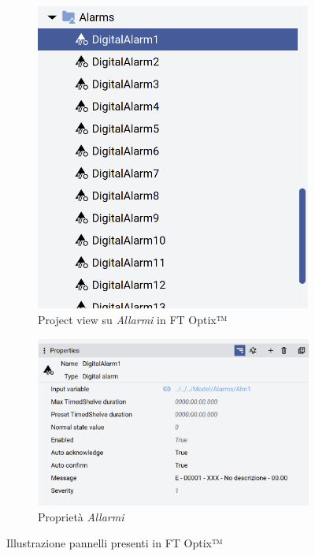 \begin{figure}[!ht]
    \centering
    \begin{subfigure}[t]{0.35\textwidth} %
        \includegraphics[width=\linewidth]{Immagini/CartellaAllarmi.png}
        \caption{Project view su \textit{Allarmi} in FT Optix™}
        \label{fig:CartellaAllarmi.png}
    \end{subfigure}
    \hfill
    \begin{subfigure}[t]{0.55\textwidth} %
        \centering
        \includegraphics[width=\linewidth]{Immagini/AllarmiInfografica.png}
        \caption{Proprietà \textit{Allarmi}}
        \label{fig:AllarmiInfografica.png}
    \end{subfigure}
    \caption{Illustrazione pannelli presenti in FT Optix™}
    \label{fig:two-images00}
\end{figure}

